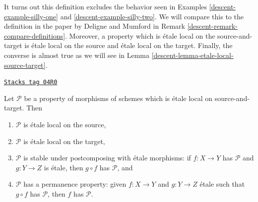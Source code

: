It turns out this definition excludes the behavior seen in
Examples \ref{descent-example-silly-one} and \ref{descent-example-silly-two}.
We will compare this to the definition in the paper
\cite{DM} by Deligne and Mumford in
Remark \ref{descent-remark-compare-definitions}.
Moreover, a property which is \'etale local on the source-and-target is
\'etale local on the source and \'etale local on the target.
Finally, the converse is almost true as we will see in
Lemma \ref{descent-lemma-etale-local-source-target}.

\begin{lemma}
\label{descent-lemma-local-source-target-implies}
\href{https://stacks.math.columbia.edu/tag/04R0}{\texttt{Stacks tag 04R0}}

Let $\mathcal{P}$ be a property of morphisms of schemes which is
\'etale local on source-and-target. Then
\begin{enumerate}
\item $\mathcal{P}$ is \'etale local on the source,
\item $\mathcal{P}$ is \'etale local on the target,
\item $\mathcal{P}$ is stable under postcomposing with \'etale morphisms:
if $f : X \to Y$ has $\mathcal{P}$ and $g : Y \to Z$ is \'etale, then
$g \circ f$ has $\mathcal{P}$, and
\item $\mathcal{P}$ has a permanence property: given $f : X \to Y$ and
$g : Y \to Z$ \'etale such that $g \circ f$ has $\mathcal{P}$, then
$f$ has $\mathcal{P}$.
\end{enumerate}
\end{lemma}

